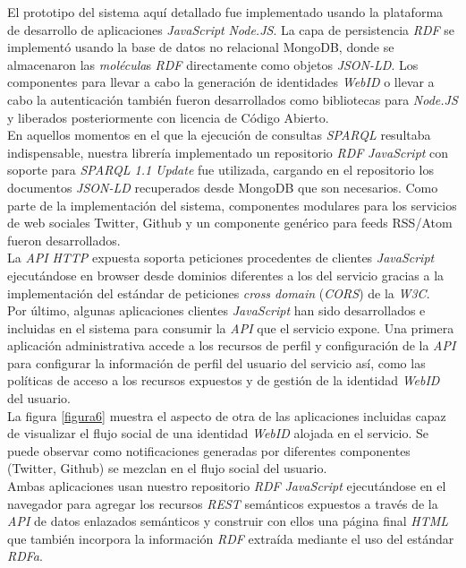 El prototipo del sistema aqu\'i detallado fue implementado usando la plataforma de desarrollo de aplicaciones \textit{JavaScript} \textit{Node.JS}. La capa de persistencia \textit{RDF} se implement\'o usando la base de datos no relacional MongoDB, donde se almacenaron las \textit{mol\'ecula}s \textit{RDF} directamente como objetos \textit{JSON-LD}. Los componentes para llevar a cabo la generaci\'on de identidades \textit{WebID} o llevar a cabo la autenticaci\'on tambi\'en fueron desarrollados como bibliotecas para \textit{Node.JS} y liberados posteriormente con licencia de C\'odigo Abierto.\\
En aquellos momentos en el que la ejecuci\'on de consultas \textit{SPARQL} resultaba indispensable, nuestra librer\'ia implementado un repositorio \textit{RDF} \textit{JavaScript} con soporte para \textit{SPARQL 1.1 Update} fue utilizada, cargando en el repositorio los documentos \textit{JSON-LD} recuperados desde MongoDB que son necesarios.
Como parte de la implementaci\'on del sistema, componentes modulares para los servicios de web sociales Twitter, Github y un componente gen\'erico para feeds RSS/Atom fueron desarrollados.\\
La \textit{API} \textit{HTTP} expuesta soporta peticiones procedentes de clientes \textit{JavaScript} ejecut\'andose en browser desde dominios diferentes a los del servicio gracias a la implementaci\'on del est\'andar de peticiones \textit{cross domain} (\textit{CORS}) \cite{cors} de la \textit{W3C}.\\
Por \'ultimo, algunas aplicaciones clientes \textit{JavaScript} han sido desarrollados e incluidas en el sistema para consumir la \textit{API} que el servicio expone. Una primera aplicaci\'on administrativa accede a los recursos de perfil y configuraci\'on de la \textit{API} para configurar la informaci\'on de perfil del usuario del servicio as\'i, como las pol\'iticas de acceso a los recursos expuestos y de gesti\'on de la identidad \textit{WebID} del usuario.\\
La figura \ref{figura6} muestra el aspecto de otra de las aplicaciones incluidas capaz de visualizar el flujo social de una identidad \textit{WebID} alojada en el servicio. Se puede observar como notificaciones generadas por diferentes componentes (Twitter, Github) se mezclan en el flujo social del usuario. \\
Ambas aplicaciones usan nuestro repositorio \textit{RDF} \textit{JavaScript} ejecut\'andose en el navegador para agregar los recursos \textit{REST} sem\'anticos expuestos a trav\'es de la \textit{API} de datos enlazados sem\'anticos y construir con ellos una p\'agina final \textit{HTML} que tambi\'en incorpora la informaci\'on \textit{RDF} extra\'ida mediante el uso del est\'andar \textit{RDFa}.

